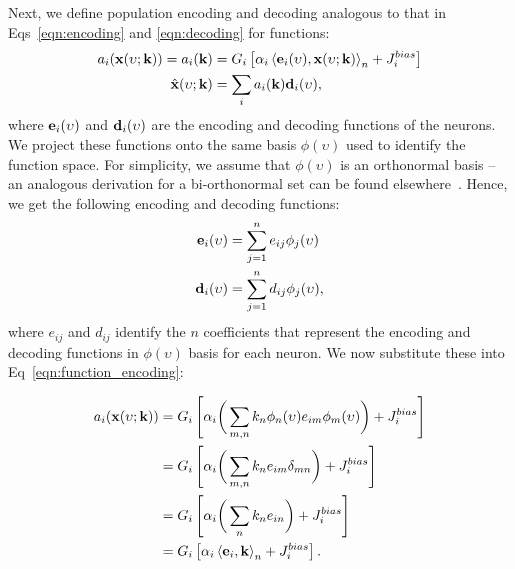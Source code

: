 \documentclass[10pt,letterpaper]{article}
\renewcommand{\vec}[1]{{\bf {#1}}}
\newcommand{\dotp}[3]{\left\langle {#1}, {#2} \right\rangle_{#3}}
\newcommand{\lif}[2]{G_{#1} \left[ {#2} \right]}
\begin{document}
Next, we define population encoding and decoding analogous to that in Eqs~\ref{eqn:encoding} and \ref{eqn:decoding} for functions:
\begin{align} 
a_i(\vec{x}(\upsilon; \vec{k})) = a_i(\vec{k}) &= \lif{i}{\alpha_i \dotp{\vec{e}_i(\upsilon)} {\vec{x}(\upsilon; \vec{k})}{n} + J_i^{bias}} \label{eqn:function_encoding} \\
\hat{\vec{x}}(\upsilon; \vec{k}) &= \sum_i a_i(\vec{k})\vec{d}_i(\upsilon), \label{eqn:function_decoding}
\end{align}
where $\vec{e}_i(\upsilon)$ and $\vec{d}_i(\upsilon)$ are the encoding and decoding functions of the neurons. We project these functions onto the same basis $\phi(\upsilon)$ used to identify the function space. For simplicity, we assume that $\phi(\upsilon)$ is an orthonormal basis -- an analogous derivation for a bi-orthonormal set can be found elsewhere~\cite{eliasmith2011normalization}. Hence, we get the following encoding and decoding functions:
\begin{align}
\vec{e}_i(\upsilon) &= \sum_{j=1}^n e_{ij} \phi_j(\upsilon) \label{eqn:encoding_function} \\
\vec{d}_i(\upsilon) &= \sum_{j=1}^n d_{ij} \phi_j(\upsilon), \label{eqn:decoding_function}
\end{align}
where $e_{ij}$ and $d_{ij}$ identify the $n$ coefficients that represent the encoding and decoding functions in $\phi(\upsilon)$ basis for each neuron. We now substitute these into Eq~\ref{eqn:function_encoding}:


\begin{equation}
\label{eqn:final_func_encoding}
\begin{aligned}
a_i(\vec{x}(\upsilon; \vec{k})) & = \lif{i}{\alpha_i\bigg(\sum_{m,n} k_n \phi_n(\upsilon) e_{im} \phi_m(\upsilon)\bigg) +  J_i^{bias}} \\
& = \lif{i}{\alpha_i\bigg(\sum_{m,n} k_n e_{im} \delta_{mn} \bigg) +  J_i^{bias}} \\ 
& = \lif{i}{\alpha_i\bigg(\sum_{n} k_n e_{in} \bigg) +  J_i^{bias}} \\
& = \lif{i}{\alpha_i \dotp{\vec{e}_i}{\vec{k}}{n} +  J_i^{bias}} .
\end{aligned}
\end{equation}
\end{document}
